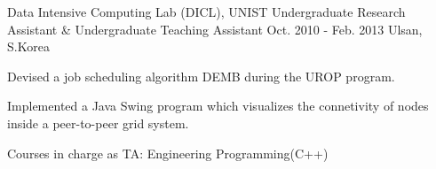 \begin{cventries}

\cventry
{Data Intensive Computing Lab (DICL), UNIST} %
{Undergraduate Research Assistant \& Undergraduate Teaching Assistant} %
{Oct. 2010 - Feb. 2013} %
{Ulsan, S.Korea} %
{ %
\begin{cvitems}
\item {Devised a job scheduling algorithm DEMB during the UROP program.}
\item {Implemented a Java Swing program which visualizes the connetivity of nodes inside a peer-to-peer grid system.}
\item {Courses in charge as TA: Engineering Programming(C++)}
\end{cvitems} 
}


\end{cventries}
